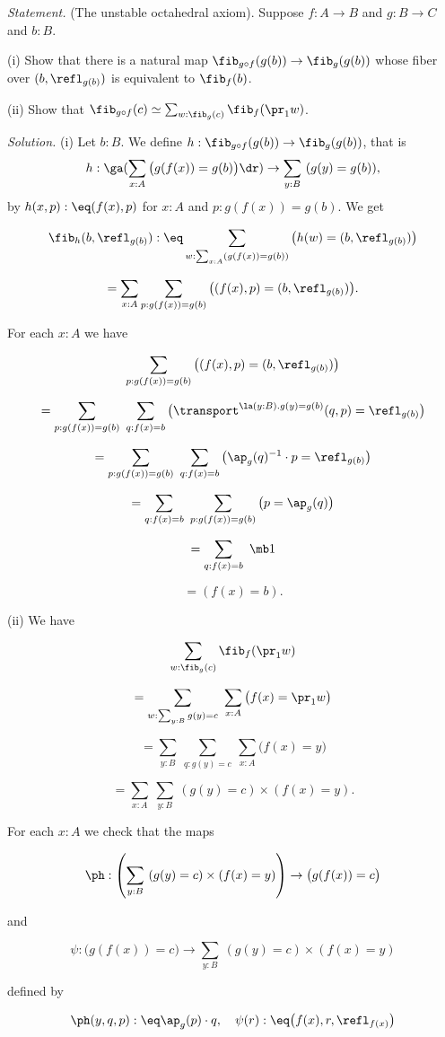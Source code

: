 \documentclass[12pt]{article}
\begin{document}
\emph{Statement.} (The unstable octahedral axiom). Suppose $f:A\to B$ and $g:B\to C$ and $b:B$.

\nn(i) Show that there is a natural map $\fib_{g\circ f}(g(b))\to\fib_g(g(b))$ whose fiber over $(b, \refl_{g(b)})$ is equivalent to $\fib_f(b)$.

\nn(ii) Show that $\fib_{g\circ f}(c)\simeq\sum_{w:\fib_g(c)}\fib_f(\pr_1w)$.

\nn\emph{Solution.} (i) Let $b:B$. We define $h:\fib_{g\circ f}(g(b))\to\fib_g(g(b))$, that is
$$
h:\ga(\sum_{x:A}\big(g(f(x))=g(b)\big)\dr)\to\sum_{y:B}\ (g(y)=g(b)),
$$ 
by $h(x,p):\eq(f(x),p)$ for $x:A$ and $p:g(f(x))=g(b)$. We get 

$$\fib_h(b,\refl_{g(b)}):\eq\sum_{w:\sum_{x:A}(g(f(x))=g(b))}\big(h(w)=(b,\refl_{g(b)})\big)$$ 

$$=\sum_{x:A}\sum_{p:g(f(x))=g(b)}\big((f(x),p)=(b,\refl_{g(b)})\big).$$ 

\nn For each $x:A$ we have

$$\sum_{p:g(f(x))=g(b)}\big((f(x),p)=(b,\refl_{g(b)})\big)$$ 

$$=\sum_{p:g(f(x))=g(b)}\ \sum_{q:f(x)=b}\big(\transport^{\la(y:B).g(y)=g(b)}(q,p)=\refl_{g(b)}\big)$$ 

$$=\sum_{p:g(f(x))=g(b)}\ \sum_{q:f(x)=b}\big(\ap_g(q)^{-1}\cdot p=\refl_{g(b)}\big)$$ 

$$=\sum_{q:f(x)=b}\ \sum_{p:g(f(x))=g(b)}\big(p=\ap_g(q)\big)$$ 

$$=\sum_{q:f(x)=b}\ \mb1$$

$$=(f(x)=b).$$ 

\nn(ii) We have 

$$\sum_{w:\fib_g(c)}\fib_f(\pr_1w)$$ 

$$=\sum_{w:\sum_{y:B}g(y)=c}\ \sum_{x:A}\big(f(x)=\pr_1w\big)$$ 

$$=\sum_{y:B}\ \sum_{q:g(y)=c}\ \sum_{x:A}\big(f(x)=y\big)$$ 

$$=\sum_{x:A}\ \sum_{y:B}\ (g(y)=c)\times(f(x)=y).$$ 

\nn For each $x:A$ we check that the maps 

$$\ph:\left(\sum_{y:B}\ (g(y)=c)\times(f(x)=y)\right)\to\big(g(f(x))=c\big)$$ 

\nn and 

$$\psi:\big(g(f(x))=c\big)\to\sum_{y:B}\ (g(y)=c)\times(f(x)=y)$$ 

\nn defined by 

$$\ph(y,q,p):\eq\ap_g(p)\cdot q,\quad\psi(r):\eq\big(f(x),r,\refl_{f(x)}\big)$$ 
\end{document}
